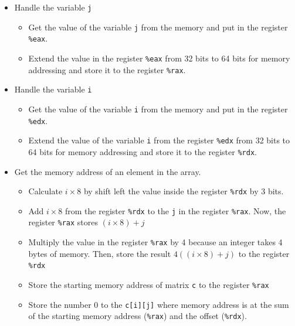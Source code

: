 \documentclass[12pt, a4paper]{article}
\begin{document}
                \begin{itemize}
                    \item Handle the variable \texttt{j}
                    \begin{itemize}
                        \item Get the value of the variable \texttt{j} from the memory and put in the register \texttt{\%eax}.
                        \item Extend the value in the register \texttt{\%eax} from 32 bits to 64 bits for memory addressing
                        and store it to the register \texttt{\%rax}.
                    \end{itemize}
                    \item Handle the variable \texttt{i}
                    \begin{itemize}
                        \item Get the value of the variable \texttt{i} from the memory and put in the register \texttt{\%edx}.
                        \item Extend the value of the variable \texttt{i} from the register \texttt{\%edx} from 32 bits to 64 bits
                        for memory addressing and store it to the register \texttt{\%rdx}.
                    \end{itemize}
                    \item Get the memory address of an element in the array.
                    \begin{itemize}
                        \item Calculate $i \times 8$ by shift left the value inside the register \texttt{\%rdx} by 3 bits.
                        \item Add $i \times 8$ from the register \texttt{\%rdx} to the \texttt{j} in the register \texttt{\%rax}.
                        Now, the register \texttt{\%rax} stores $(i \times 8) + j$
                        \item Multiply the value in the register \texttt{\%rax} by 4 because an integer takes 4 bytes of memory.
                        Then, store the result $4((i \times 8) + j)$ to the register \texttt{\%rdx}
                        \item Store the starting memory address of matrix \texttt{c} to the register \texttt{\%rax}
                        \item Store the number 0 to the \texttt{c[i][j]} where memory address is at the sum of the
                        starting memory address (\texttt{\%rax}) and the offset (\texttt{\%rdx}).
                    \end{itemize}
                \end{itemize}
\end{document}
